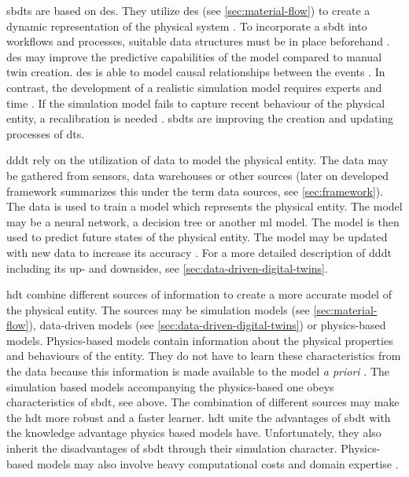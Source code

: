 \gls{sbdt}s \autocite{Lugaresi2021aifac,martinez2018automatic,boschert2016digital} are based on \gls{des}. They utilize \gls{des} (see \autoref{sec:material-flow}) to create a dynamic representation of the physical system \autocite{schluse2016simulation,pantelides2013online}. To incorporate a \gls{sbdt} into workflows and processes, suitable data structures must be in place beforehand \autocite{boschert2016digital}. \gls{des} may improve the predictive capabilities of the model compared to manual twin creation. \gls{des} is able to model causal relationships between the events \autocite{francis2021towards}. In contrast, the development of a realistic simulation model requires experts and time \autocite{Charpentier2014}. If the simulation model fails to capture recent behaviour of the physical entity, a recalibration is needed \autocite{Friederich2022}. \gls{sbdt}s are improving the creation and updating processes of \gls{dt}s.

\gls{dddt} rely on the utilization of data to model the physical entity. The data may be gathered from sensors, data warehouses or other sources (later on developed framework summarizes this under the term data sources, see \autoref{sec:framework}). The data is used to train a model which represents the physical entity. The model may be a neural network, a decision tree or another \gls{ml} model. The model is then used to predict future states of the physical entity. The model may be updated with new data to increase its accuracy \autocite{he2019data,Friederich2022}. For a more detailed description of \gls{dddt} including its up- and downsides, see \autoref{sec:data-driven-digital-twins}.

\gls{hdt} combine different sources of information to create a more accurate model of the physical entity. The sources may be simulation models (see \autoref{sec:material-flow}), data-driven models (see \autoref{sec:data-driven-digital-twins}) or physics-based models. Physics-based models contain information about the physical properties and behaviours of the entity. They do not have to learn these characteristics from the data because this information is made available to the model \textit{a priori} \autocite{kapteyn2022data,aivaliotis2019methodology}. The simulation based models accompanying the physics-based one obeys characteristics of \gls{sbdt}, see above. The combination of different sources may make the \gls{hdt} more robust and a faster learner. \gls{hdt} unite the advantages of \gls{sbdt} with the knowledge advantage physics based models have. Unfortunately, they also inherit the disadvantages of \gls{sbdt} through their simulation character. Physics-based models may also involve heavy computational costs and domain expertise \autocite{kapteyn2022data}.

